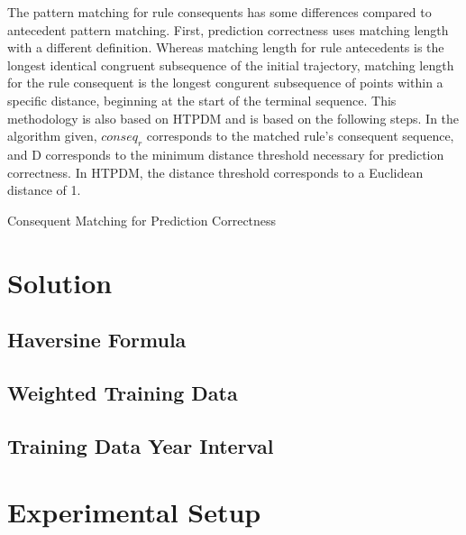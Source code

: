 \documentclass[12pt,conference]{IEEEtran}
\begin{document}
The pattern matching for rule consequents has some differences compared to antecedent pattern matching. First, prediction correctness uses matching length with a different definition. Whereas matching length for rule antecedents is the longest identical congruent subsequence of the initial trajectory, matching length for the rule consequent is the longest congurent subsequence of points within a specific distance, beginning at the start of the terminal sequence. This methodology is also based on HTPDM and is based on the following steps. In the algorithm given, $conseq_{r}$ corresponds to the matched rule's consequent sequence, and D corresponds to the minimum distance threshold necessary for prediction correctness. In HTPDM, the distance threshold corresponds to a Euclidean distance of 1.

\begin{algorithm}[H]
  \caption{Consequent Matching for Prediction Correctness}
  \label{consequent_matching}
  \begin{algorithmic}[1]
  \EndIf
  \end{algorithmic}
\end{algorithm}



\section{Solution}

\subsection{Haversine Formula}

\subsection{Weighted Training Data}

\subsection{Training Data Year Interval}

\section{Experimental Setup}
\end{document}

